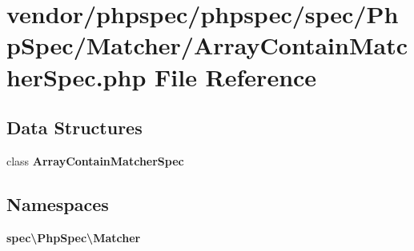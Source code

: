 \section{vendor/phpspec/phpspec/spec/\+Php\+Spec/\+Matcher/\+Array\+Contain\+Matcher\+Spec.php File Reference}
\label{_array_contain_matcher_spec_8php}
\subsection*{Data Structures}
\begin{DoxyCompactItemize}
\item 
class {\bf Array\+Contain\+Matcher\+Spec}
\end{DoxyCompactItemize}
\subsection*{Namespaces}
\begin{DoxyCompactItemize}
\item 
 {\bf spec\textbackslash{}\+Php\+Spec\textbackslash{}\+Matcher}
\end{DoxyCompactItemize}
